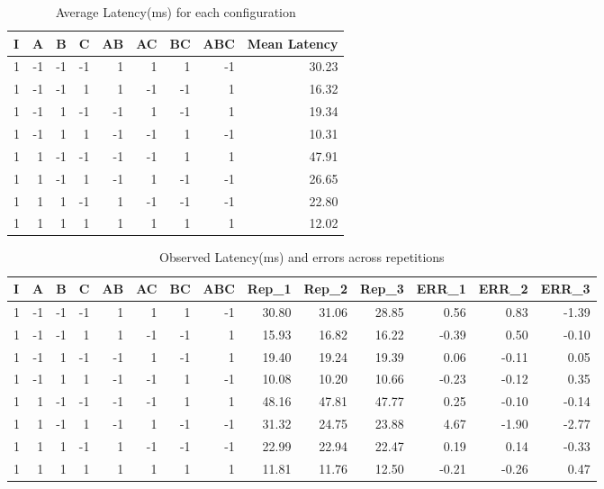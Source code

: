 \documentclass[11pt,a4paper]{article}
\begin{document}
\begin{table}[H]
	\caption{Average Latency(ms) for each configuration}
	\centering
	\begin{tabular}{|r|r|r|r|r|r|r|r|r|}
		\hline
		\multicolumn{1}{|l|}{I} & \multicolumn{1}{l|}{A} & \multicolumn{1}{l|}{B} & \multicolumn{1}{l|}{C} & \multicolumn{1}{l|}{AB} & \multicolumn{1}{l|}{AC} & \multicolumn{1}{l|}{BC} & \multicolumn{1}{l|}{ABC} & \multicolumn{1}{l|}{Mean Latency} \\ \hline
		1 & -1 & -1 & -1 & 1 & 1 & 1 & -1 & 30.23 \\ \hline
		1 & -1 & -1 & 1 & 1 & -1 & -1 & 1 & 16.32 \\ \hline
		1 & -1 & 1 & -1 & -1 & 1 & -1 & 1 & 19.34 \\ \hline
		1 & -1 & 1 & 1 & -1 & -1 & 1 & -1 & 10.31 \\ \hline
		1 & 1 & -1 & -1 & -1 & -1 & 1 & 1 & 47.91 \\ \hline
		1 & 1 & -1 & 1 & -1 & 1 & -1 & -1 & 26.65 \\ \hline
		1 & 1 & 1 & -1 & 1 & -1 & -1 & -1 & 22.80 \\ \hline
		1 & 1 & 1 & 1 & 1 & 1 & 1 & 1 & 12.02 \\ \hline
	\end{tabular}
	\label{}
\end{table}

\begin{table}[H]
	\caption{Observed Latency(ms) and errors across repetitions}
	\centering
	\begin{tabular}{|r|r|r|r|r|r|r|r|r|r|r|r|r|r|}
		\hline
		\multicolumn{1}{|l|}{I} & \multicolumn{1}{l|}{A} & \multicolumn{1}{l|}{B} & \multicolumn{1}{l|}{C} & \multicolumn{1}{l|}{AB} & \multicolumn{1}{l|}{AC} & \multicolumn{1}{l|}{BC} & \multicolumn{1}{l|}{ABC} & \multicolumn{1}{l|}{Rep\_1} & \multicolumn{1}{l|}{Rep\_2} & \multicolumn{1}{l|}{Rep\_3} & \multicolumn{1}{l|}{ERR\_1} & \multicolumn{1}{l|}{ERR\_2} & \multicolumn{1}{l|}{ERR\_3} \\ \hline
		1 & -1 & -1 & -1 & 1 & 1 & 1 & -1 & 30.80 & 31.06 & 28.85 & 0.56 & 0.83 & -1.39 \\ \hline
		1 & -1 & -1 & 1 & 1 & -1 & -1 & 1 & 15.93 & 16.82 & 16.22 & -0.39 & 0.50 & -0.10 \\ \hline
		1 & -1 & 1 & -1 & -1 & 1 & -1 & 1 & 19.40 & 19.24 & 19.39 & 0.06 & -0.11 & 0.05 \\ \hline
		1 & -1 & 1 & 1 & -1 & -1 & 1 & -1 & 10.08 & 10.20 & 10.66 & -0.23 & -0.12 & 0.35 \\ \hline
		1 & 1 & -1 & -1 & -1 & -1 & 1 & 1 & 48.16 & 47.81 & 47.77 & 0.25 & -0.10 & -0.14 \\ \hline
		1 & 1 & -1 & 1 & -1 & 1 & -1 & -1 & 31.32 & 24.75 & 23.88 & 4.67 & -1.90 & -2.77 \\ \hline
		1 & 1 & 1 & -1 & 1 & -1 & -1 & -1 & 22.99 & 22.94 & 22.47 & 0.19 & 0.14 & -0.33 \\ \hline
		1 & 1 & 1 & 1 & 1 & 1 & 1 & 1 & 11.81 & 11.76 & 12.50 & -0.21 & -0.26 & 0.47 \\ \hline
	\end{tabular}
	\label{}
\end{table}
\end{document}
